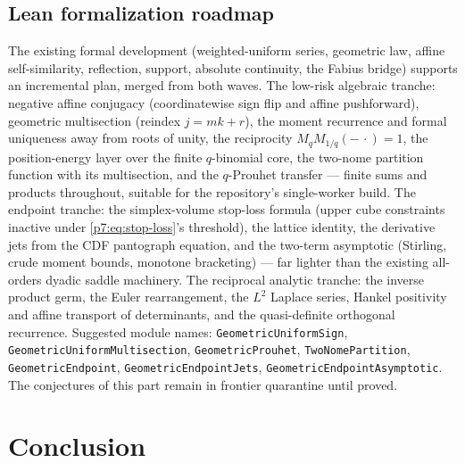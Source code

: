 \documentclass[11pt,oneside]{article}
\numberwithin{equation}{section}
\theoremstyle{definition}
\theoremstyle{remark}
\begin{document}
\subsection{Lean formalization roadmap}

The existing formal development (weighted-uniform series, geometric law,
affine self-similarity, reflection, support, absolute continuity, the Fabius
bridge) supports an incremental plan, merged from both waves.  The low-risk
algebraic tranche: negative affine conjugacy (coordinatewise sign flip and
affine pushforward), geometric multisection (reindex $j=mk+r$), the moment
recurrence and formal uniqueness away from roots of unity, the reciprocity
$M_qM_{1/q}(-\,\cdot)=1$, the position-energy layer over the finite
$q$-binomial core, the two-nome partition function with its multisection, and
the $q$-Prouhet transfer --- finite sums and products throughout, suitable
for the repository's single-worker build.  The endpoint tranche: the
simplex-volume stop-loss formula (upper cube constraints inactive under
\eqref{p7:eq:stop-loss}'s threshold), the lattice identity, the derivative
jets from the CDF pantograph equation, and the two-term asymptotic
(Stirling, crude moment bounds, monotone bracketing) --- far lighter than the
existing all-orders dyadic saddle machinery.  The reciprocal analytic
tranche: the inverse product germ, the Euler rearrangement, the $L^2$ Laplace
series, Hankel positivity and affine transport of determinants, and the
quasi-definite orthogonal recurrence.  Suggested module names:
\texttt{GeometricUniformSign}, \texttt{GeometricUniformMultisection},
\texttt{GeometricProuhet}, \texttt{TwoNomePartition},
\texttt{GeometricEndpoint}, \texttt{GeometricEndpointJets},
\texttt{GeometricEndpointAsymptotic}.  The conjectures of this part remain in
frontier quarantine until proved.

\section{Conclusion}
\end{document}
